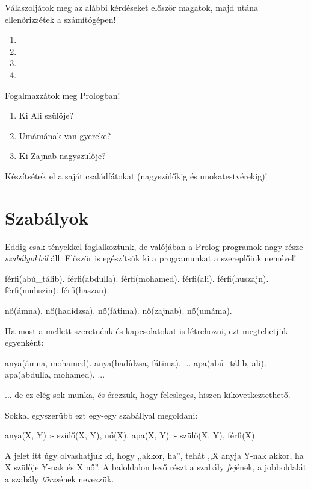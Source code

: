 \begin{problem}
Válaszoljátok meg az alábbi kérdéseket először magatok, majd utána ellenőrizzétek a számítógépen!
\begin{enumerate}
\item {}
\item {}
\item {}
\item {}
\end{enumerate}
\end{problem}
\begin{problem}
Fogalmazzátok meg Prologban!
\begin{enumerate}
\item Ki Ali szülője?
\item Umámának van gyereke?
\item Ki Zajnab nagyszülője?
\end{enumerate}
\end{problem}
\begin{problem}
Készítsétek el a saját családfátokat (nagyszülőkig
és unokatestvérekig)!
\end{problem}

\section{Szabályok}

Eddig csak tényekkel foglalkoztunk, de valójában a
Prolog programok nagy része \emph{szabályokból}
áll. Először is egészítsük ki a programunkat a
szereplőink nemével!

\begin{prolog}
férfi(abú_tálib).
férfi(abdulla).
férfi(mohamed).
férfi(ali).
férfi(huszajn).
férfi(muhszin).
férfi(haszan).

nő(ámna).
nő(hadídzsa).
nő(fátima).
nő(zajnab).
nő(umáma).
\end{prolog}

Ha most a  mellett szeretnénk  és  kapcsolatokat is létrehozni, ezt megtehetjük egyenként:
\begin{prolog}
anya(ámna, mohamed).
anya(hadídzsa, fátima).
...
apa(abú_tálib, ali).
apa(abdulla, mohamed).
...
\end{prolog}
... de ez elég sok munka, és érezzük, hogy felesleges, hiszen kikövetkeztethető.

Sokkal egyszerűbb ezt egy-egy szabállyal megoldani:
\begin{prolog}
anya(X, Y) :- szülő(X, Y), nő(X).
apa(X, Y) :- szülő(X, Y), férfi(X).
\end{prolog}
A \pr{:-} jelet itt úgy olvashatjuk ki, hogy ,,akkor, ha'', tehát ,,X anyja Y-nak akkor, ha X szülője Y-nak és X nő''. A baloldalon levő részt a szabály \emph{fej}\/ének, a jobboldalát a szabály \emph{törzs}\/ének nevezzük.
  
